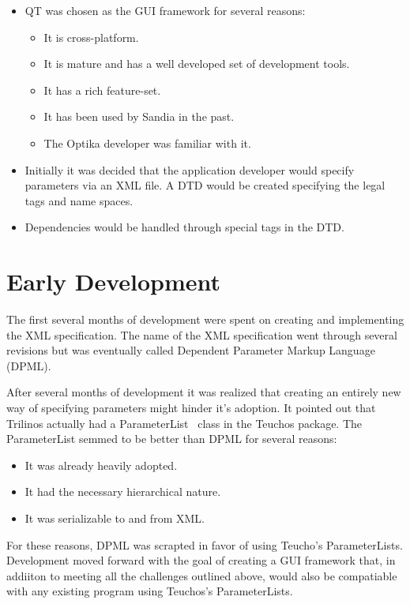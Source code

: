 \begin{itemize}
		\item QT was chosen as the GUI framework for several reasons:
			\begin{itemize}
				\item It is cross-platform.
				\item It is mature and has a well developed set of
				development tools.
				\item It has a rich feature-set.
				\item It has been used by Sandia in the past.
				\item The Optika developer was familiar with it.
			\end{itemize}
		\item Initially it was decided that the application developer would
		specify parameters via an XML file. A DTD would be created specifying
		the legal tags and name spaces.
		\item Dependencies would be handled through special tags in the DTD.
	\end{itemize}

\section{Early Development}
The first several months of development were spent on creating and implementing the XML
specification. The name of the XML specification went through several revisions but was
eventually called Dependent Parameter Markup Language (DPML).

After several months of development it was realized that creating an entirely new way of specifying 
parameters might hinder it's adoption. It pointed out that Trilinos actually had
a ParameterList~\cite{ParameterList} class in the Teuchos package. The ParameterList semmed to be better than DPML for
several reasons:
	\begin{itemize}
		\item It was already heavily adopted.
		\item It had the necessary hierarchical nature.
		\item It was serializable to and from XML.
	\end{itemize}

For these reasons, DPML was scrapted in favor of using Teucho's ParameterLists. Development moved
forward with the goal of creating a GUI framework that, in addiiton to meeting all the challenges 
outlined above, would also be compatiable with any existing program using Teuchos's ParameterLists.

